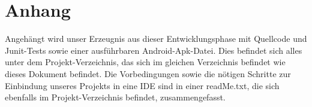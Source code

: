 \section{Anhang}

Angehängt wird unser Erzeugnis aus dieser Entwicklungsphase mit Quellcode und Junit-Tests sowie einer ausführbaren Android-Apk-Datei.
Dies befindet sich alles unter dem Projekt-Verzeichnis, das sich im gleichen Verzeichnis befindet wie dieses Dokument befindet. Die Vorbedingungen sowie die nötigen Schritte zur Einbindung unseres Projekts in eine IDE sind in einer readMe.txt, die sich ebenfalls im Projekt-Verzeichnis befindet, zusammengefasst.
